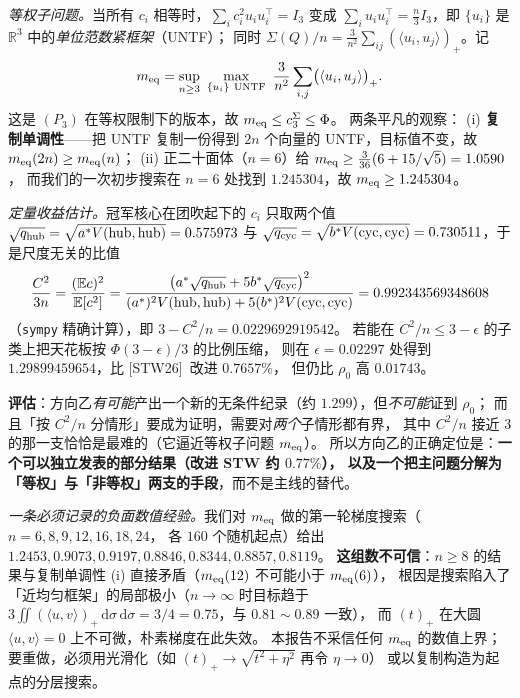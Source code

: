 \documentclass[UTF8,11pt]{ctexart}
\theoremstyle{definition}
\newcommand{\dd}{\,\mathrm{d}}
\newcommand{\R}{\mathbb{R}}
\newcommand{\STW}{\textup{[STW26]}}
\begin{document}
\emph{等权子问题。}当所有 $c_i$ 相等时，$\sum_ic_i^2u_iu_i^\top=I_3$ 变成
$\sum_iu_iu_i^\top=\frac n3I_3$，即 $\{u_i\}$ 是 $\R^3$ 中的\emph{单位范数紧框架}（UNTF）；
同时 $\Sigma(Q)/n=\frac3{n^2}\sum_{ij}(\langle u_i,u_j\rangle)_+$。记
\[
m_{\rm eq}=\sup_{n\ge3}\ \max_{\{u_i\}\ \mathrm{UNTF}}\ \frac3{n^2}\sum_{i,j}\bigl(\langle u_i,u_j\rangle\bigr)_+ .
\]
这是 $(P_3)$ 在等权限制下的版本，故 $m_{\rm eq}\le c_3^{\Sigma}\le\Phi$。
两条平凡的观察：
(i) \textbf{复制单调性}——把 UNTF 复制一份得到 $2n$ 个向量的 UNTF，目标值不变，故 $m_{\rm eq}(2n)\ge m_{\rm eq}(n)$；
(ii) 正二十面体（$n=6$）给 $m_{\rm eq}\ge\frac3{36}(6+15/\sqrt5)=1.0590$，
而我们的一次初步搜索在 $n=6$ 处找到 $1.245304$，故 $m_{\rm eq}\ge1.245304$。

\emph{定量收益估计。}冠军核心在团吹起下的 $c_i$ 只取两个值
$\sqrt{q_{\rm hub}}=\sqrt{a^*V(\text{hub},\text{hub})}=0.575973$ 与
$\sqrt{q_{\rm cyc}}=\sqrt{b^*V(\text{cyc},\text{cyc})}=0.730511$，于是尺度无关的比值
\[
\frac{C^2}{3n}=\frac{(\mathbb E c)^2}{\mathbb E[c^2]}
=\frac{\bigl(a^*\sqrt{q_{\rm hub}}+5b^*\sqrt{q_{\rm cyc}}\bigr)^2}{(a^*)^2V(\text{hub},\text{hub})+5(b^*)^2V(\text{cyc},\text{cyc})}
=0.992343569348608
\]
（\texttt{sympy} 精确计算），即 $3-C^2/n=0.0229692919542$。
若能在 $C^2/n\le3-\epsilon$ 的子类上把天花板按 $\Phi(3-\epsilon)/3$ 的比例压缩，
则在 $\epsilon=0.02297$ 处得到 $1.29899459654$，比 \STW\ 改进 $0.7657\%$，
但仍比 $\rho_0$ 高 $0.01743$。

\textbf{评估}：方向乙\emph{有可能}产出一个新的无条件纪录（约 $1.299$），但\emph{不可能}证到 $\rho_0$；
而且「按 $C^2/n$ 分情形」要成为证明，需要对\emph{两个}子情形都有界，
其中 $C^2/n$ 接近 $3$ 的那一支恰恰是最难的（它逼近等权子问题 $m_{\rm eq}$）。
所以方向乙的正确定位是：\textbf{一个可以独立发表的部分结果（改进 STW 约 $0.77\%$），
以及一个把主问题分解为「等权」与「非等权」两支的手段}，而不是主线的替代。

\emph{一条必须记录的负面数值经验。}我们对 $m_{\rm eq}$ 做的第一轮梯度搜索（$n=6,8,9,12,16,18,24$，
各 $160$ 个随机起点）给出 $1.2453,0.9073,0.9197,0.8846,0.8344,0.8857,0.8119$。
\textbf{这组数不可信}：$n\ge8$ 的结果与复制单调性 (i) 直接矛盾（$m_{\rm eq}(12)$ 不可能小于 $m_{\rm eq}(6)$），
根因是搜索陷入了「近均匀框架」的局部极小（$n\to\infty$ 时目标趋于
$3\iint(\langle u,v\rangle)_+\dd\sigma\dd\sigma=3/4=0.75$，与 $0.81\sim0.89$ 一致），
而 $(t)_+$ 在大圆 $\langle u,v\rangle=0$ 上不可微，朴素梯度在此失效。
本报告不采信任何 $m_{\rm eq}$ 的数值上界；要重做，必须用光滑化（如 $(t)_+\to\sqrt{t^2+\eta^2}$ 再令 $\eta\to0$）
或以复制构造为起点的分层搜索。
\end{document}
